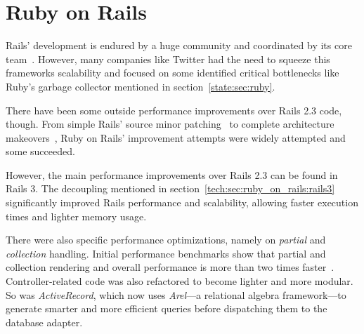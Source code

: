 \section{Ruby on Rails} %
\label{state:sec:ruby_on_rails}
Rails' development is endured by a huge community and coordinated by its core team~\cite{rails_core_team}. However, many companies like Twitter had the need to squeeze this frameworks scalability and focused on some identified critical bottlenecks like Ruby's garbage collector mentioned in section~\ref{state:sec:ruby}.

There have been some outside performance improvements over Rails 2.3 code, though. From simple Rails' source minor patching~\cite{accunote_rails} to complete architecture makeovers~\cite{distributed_rails}, Ruby on Rails' improvement attempts were widely attempted and some succeeded.

However, the main performance improvements over Rails 2.3 can be found in Rails 3. The decoupling mentioned in section~\ref{tech:sec:ruby_on_rails:rails3} significantly improved Rails performance and scalability, allowing faster execution times and lighter memory usage.

There were also specific performance optimizations, namely on \textit{partial} and \textit{collection} handling. Initial performance benchmarks show that partial and collection rendering and overall performance is more than two times faster~\cite{vaporware_to_awesome,rails_merb_merge_performance}. Controller-related code was also refactored to become lighter and more modular. So was \textit{ActiveRecord}, which now uses \textit{Arel}---a relational algebra framework---to generate smarter and more efficient queries before dispatching them to the database adapter.

